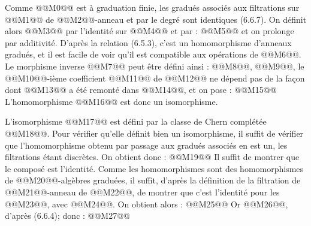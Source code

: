 

Comme @@M0@@ est à graduation finie, les gradués associés aux filtrations sur @@M1@@ de @@M2@@-anneau et par le degré sont identiques (6.6.7). On définit alors @@M3@@ par l'identité sur @@M4@@ et par :
@@M5@@
et on prolonge par additivité. D'après la relation (6.5.3), c'est un homomorphisme d'anneaux gradués, et il est facile de voir qu'il est compatible aux opérations de @@M6@@. Le morphisme inverse @@M7@@ peut être défini ainsi : @@M8@@, @@M9@@, le @@M10@@-ième coefficient @@M11@@ de @@M12@@ ne dépend pas de la façon dont @@M13@@ a été remonté dans @@M14@@, et on pose :
@@M15@@
L'homomorphisme @@M16@@ est donc un isomorphisme.

L'isomorphisme @@M17@@ est défini par la classe de Chern complétée @@M18@@. Pour vérifier qu'elle définit bien un isomorphisme, il suffit de vérifier que l'homomorphisme obtenu par passage aux gradués associés en est un, les filtrations étant discrètes. On obtient donc :
@@M19@@
Il suffit de montrer que le composé est l'identité. Comme les homomorphismes sont des homomorphismes de @@M20@@-algèbres graduées, il suffit, d'après la définition de la filtration de @@M21@@-anneau de @@M22@@, de montrer que c'est l'identité pour les @@M23@@, avec @@M24@@. On obtient alors :
@@M25@@
Or @@M26@@, d'après (6.6.4); donc :
@@M27@@
